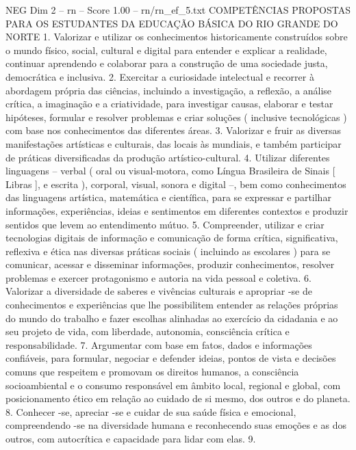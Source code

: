 \begin{textsample}{NEG Dim 2 – rn – Score 1.00 – rn/rn\_ef\_5.txt}  \label{ex:f2_neg_049}
COMPETÊNCIAS PROPOSTAS PARA OS ESTUDANTES DA EDUCAÇÃO BÁSICA DO RIO GRANDE DO NORTE 1.
Valorizar e utilizar os conhecimentos historicamente construídos sobre o mundo físico, social, cultural e digital para entender e explicar a realidade, continuar aprendendo e colaborar para a construção de uma sociedade justa, democrática e inclusiva. 2.
Exercitar a curiosidade intelectual e recorrer à abordagem própria das ciências, incluindo a investigação, a reflexão, a análise crítica, a imaginação e a criatividade, para investigar causas, elaborar e testar hipóteses, formular e resolver problemas e criar soluções ( inclusive tecnológicas ) com base nos conhecimentos das diferentes áreas. 3.
Valorizar e fruir as diversas manifestações artísticas e culturais, das locais às mundiais, e também participar de práticas diversificadas da produção artístico-cultural. 4.
Utilizar diferentes linguagens – verbal ( oral ou visual-motora, como Língua Brasileira de Sinais [ Libras ], e escrita ), corporal, visual, sonora e digital –, bem como conhecimentos das linguagens artística, matemática e científica, para se expressar e partilhar informações, experiências, ideias e sentimentos em diferentes contextos e produzir sentidos que levem ao entendimento mútuo. 5.
Compreender, utilizar e criar tecnologias digitais de informação e comunicação de forma crítica, significativa, reflexiva e ética nas diversas práticas sociais ( incluindo as escolares ) para se comunicar, acessar e disseminar informações, produzir conhecimentos, resolver problemas e exercer protagonismo e autoria na vida pessoal e coletiva. 6.
Valorizar a diversidade de saberes e vivências culturais e apropriar -se de conhecimentos e experiências que lhe possibilitem entender as relações próprias do mundo do trabalho e fazer escolhas alinhadas ao exercício da cidadania e ao seu projeto de vida, com liberdade, autonomia, consciência crítica e responsabilidade. 7.
Argumentar com base em fatos, dados e informações confiáveis, para formular, negociar e defender ideias, pontos de vista e decisões comuns que respeitem e promovam os direitos humanos, a consciência socioambiental e o consumo responsável em âmbito local, regional e global, com posicionamento ético em relação ao cuidado de si mesmo, dos outros e do planeta. 8.
Conhecer -se, apreciar -se e cuidar de sua saúde física e emocional, compreendendo -se na diversidade humana e reconhecendo suas emoções e as dos outros, com autocrítica e capacidade para lidar com elas. 9.

\end{textsample}

